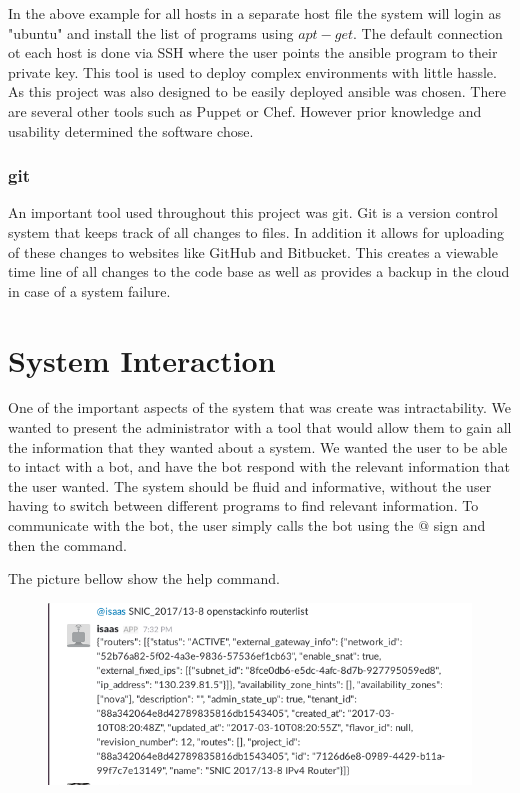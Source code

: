 \documentclass[12pt]{article}
\begin{document}
In the above example for all hosts in a separate host file the system will login as "ubuntu" and install the list of programs using $apt-get$. The default connection ot each host is done via SSH where the user points the ansible program to their private key.  This tool is used to deploy complex environments with little hassle.  As this project was also designed to be easily deployed ansible was chosen. There are several other tools such as Puppet or Chef. However prior knowledge and usability determined the software chose. 

\subsubsection{git}
An important tool used throughout this project was git. Git is a version control system that keeps track of all changes to files. In addition it allows for uploading of these changes to websites like GitHub and Bitbucket. This creates a viewable time line of all changes to the code base as well as provides a backup in the cloud in case of a system failure. 

\section{System Interaction}
One of the important aspects of the system that was create was intractability. We wanted to present the administrator with a tool that would allow them to gain all the information that they wanted about a system. We wanted the user to be able to intact with a bot, and have the bot respond with the relevant information that the user wanted. The system should be fluid and informative, without the user having to switch between different programs to find relevant information. To communicate with the bot, the user simply calls the bot using the $@$ sign and then the command. 

The picture bellow show the help command. 
\begin{figure}[ht]
    \includegraphics[scale=.5]{./pic/2017-06-13-184017_652x280_scrot.png}
\end{figure}
\end{document}
